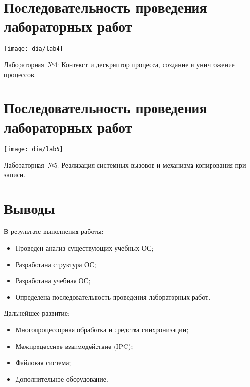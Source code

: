 \documentclass[12pt]{article}
\begin{document}
\section{\textbf{Последовательность проведения лабораторных работ}}
\begin{center}
\texttt{[image: dia/lab4]}
\end{center}

Лабораторная~№4: Контекст и дескриптор процесса, создание и уничтожение процессов.

\section{\textbf{Последовательность проведения лабораторных работ}}
\begin{center}
\texttt{[image: dia/lab5]}
\end{center}

Лабораторная~№5: Реализация системных вызовов и механизма копирования при записи.

\section{\textbf{Выводы}}
В результате выполнения работы:
\begin{itemize}
\item Проведен анализ существующих учебных ОС;
\item Разработана структура ОС;
\item Разработана учебная ОС;
\item Определена последовательность проведения лабораторных работ.
\end{itemize}

Дальнейшее развитие:
\begin{itemize}
\item Многопроцессорная обработка и средства синхронизации;
\item Межпроцессное взаимодействие (IPC);
\item Файловая система;
\item Дополнительное оборудование.
\end{itemize}
\end{document}
